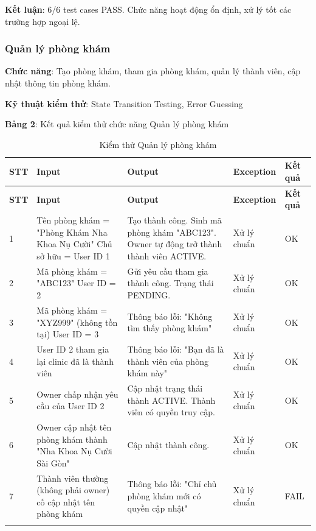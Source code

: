 \textbf{Kết luận}: 6/6 test cases PASS. Chức năng hoạt động ổn định, xử lý tốt các trường hợp ngoại lệ.

\subsubsection{Quản lý phòng khám}

\textbf{Chức năng}: Tạo phòng khám, tham gia phòng khám, quản lý thành viên, cập nhật thông tin phòng khám.

\textbf{Kỹ thuật kiểm thử}: State Transition Testing, Error Guessing

\textbf{Bảng 2}: Kết quả kiểm thử chức năng Quản lý phòng khám

\begin{longtable}{|p{1cm}|p{5cm}|p{4cm}|p{3cm}|p{1.5cm}|}
\hline
\textbf{STT} & \textbf{Input} & \textbf{Output} & \textbf{Exception} & \textbf{Kết quả} \\
\hline
\endfirsthead

\hline
\textbf{STT} & \textbf{Input} & \textbf{Output} & \textbf{Exception} & \textbf{Kết quả} \\
\hline
\endhead

\hline
\endfoot

1 & Tên phòng khám = "Phòng Khám Nha Khoa Nụ Cười" \newline Chủ sở hữu = User ID 1 & Tạo thành công. Sinh mã phòng khám "ABC123". Owner tự động trở thành thành viên ACTIVE. & Xử lý chuẩn & OK \\
\hline

2 & Mã phòng khám = "ABC123" \newline User ID = 2 & Gửi yêu cầu tham gia thành công. Trạng thái PENDING. & Xử lý chuẩn & OK \\
\hline

3 & Mã phòng khám = "XYZ999" (không tồn tại) \newline User ID = 3 & Thông báo lỗi: "Không tìm thấy phòng khám" & Xử lý chuẩn & OK \\
\hline

4 & User ID 2 tham gia lại clinic đã là thành viên & Thông báo lỗi: "Bạn đã là thành viên của phòng khám này" & Xử lý chuẩn & OK \\
\hline

5 & Owner chấp nhận yêu cầu của User ID 2 & Cập nhật trạng thái thành ACTIVE. Thành viên có quyền truy cập. & Xử lý chuẩn & OK \\
\hline

6 & Owner cập nhật tên phòng khám thành "Nha Khoa Nụ Cười Sài Gòn" & Cập nhật thành công. & Xử lý chuẩn & OK \\
\hline

7 & Thành viên thường (không phải owner) cố cập nhật tên phòng khám & Thông báo lỗi: "Chỉ chủ phòng khám mới có quyền cập nhật" & Xử lý chuẩn & FAIL \\
\hline

\caption{Kiểm thử Quản lý phòng khám}
\end{longtable}

